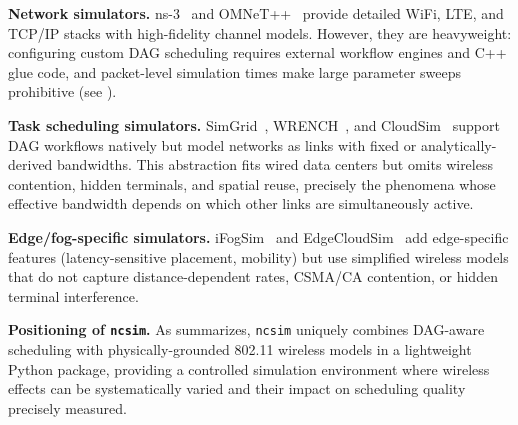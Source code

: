 \documentclass[conference]{IEEEtran}
\newcommand{\ncsim}{\texttt{ncsim}}
\begin{document}
\textbf{Network simulators.}
ns-3~\cite{ns3} and OMNeT++~\cite{omnetpp} provide detailed WiFi, LTE,
and TCP/IP stacks with high-fidelity channel models.  However, they are
heavyweight: configuring custom DAG scheduling requires external workflow
engines and C++ glue code, and packet-level simulation times make large
parameter sweeps prohibitive (see ).

\textbf{Task scheduling simulators.}
SimGrid~\cite{simgrid}, WRENCH~\cite{wrench}, and CloudSim~\cite{cloudsim}
support DAG workflows natively but model networks as links with fixed or
analytically-derived bandwidths.  This abstraction fits wired data centers
but omits wireless contention, hidden terminals, and spatial reuse,
precisely the phenomena whose effective bandwidth depends on which other
links are simultaneously active.

\textbf{Edge/fog-specific simulators.}
iFogSim~\cite{ifogsim} and EdgeCloudSim~\cite{edgecloudsim} add
edge-specific features (latency-sensitive placement, mobility) but use
simplified wireless models that do not capture distance-dependent rates,
CSMA/CA contention, or hidden terminal interference.

\textbf{Positioning of \ncsim{}.}
As  summarizes, \ncsim{} uniquely combines
DAG-aware scheduling with physically-grounded 802.11 wireless models
in a lightweight Python package, providing a controlled simulation
environment where wireless effects can be systematically varied and their
impact on scheduling quality precisely measured.
\end{document}
